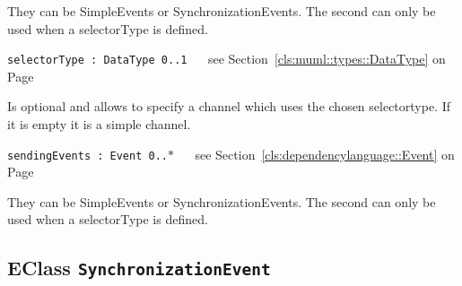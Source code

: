 \begin{longdescription}
\begin{longdescription}
	

		They can be  SimpleEvents or  SynchronizationEvents.
The second can only be used when a selectorType is defined.		
	\item[\texttt{selectorType : DataType \symbol{"5B}0..1\symbol{"5D}
}] ~
	see Section~\ref{cls:muml::types::DataType} on Page~\pageref{cls:muml::types::DataType}
	
	\nopagebreak
		
				

	

		Is optional and allows to specify a channel which uses the chosen selectortype.
If it is empty it is a simple channel.		
	\item[\texttt{sendingEvents : Event \symbol{"5B}0..$*$\symbol{"5D}
}] ~
	see Section~\ref{cls:dependencylanguage::Event} on Page~\pageref{cls:dependencylanguage::Event}
	
	\nopagebreak
		
				

	

		They can be  SimpleEvents or  SynchronizationEvents.
The second can only be used when a selectorType is defined.		
			\end{longdescription}
	
	\end{longdescription}
	

\subsection{EClass \bfseries \texttt{SynchronizationEvent}\normalfont}
\label{cls:dependencylanguage::SynchronizationEvent} 
	
